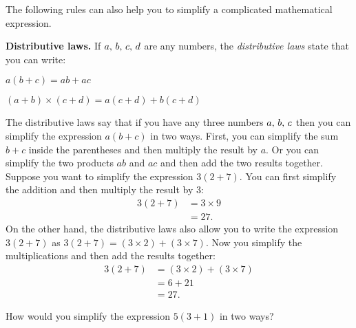\documentclass[a4paper,oneside,12pt]{article}
\begin{document}
The following rules can also help you to simplify a complicated
mathematical expression.

\begin{definition}
\textbf{Distributive laws.}
If ${a},\, {b},\, {c},\, {d}$ are any numbers, the
\emph{distributive laws} state that you can write:
\begin{packedenumeral}
\item $a (b + c) = ab + ac$

\item $(a + b) \times (c + d) = a(c + d) + b(c + d)$
\end{packedenumeral}
\end{definition}

The distributive laws say that if you have any three numbers
${a},\, {b},\, {c}$ then you can simplify the expression
$a(b + c)$ in two ways.  First, you can simplify the sum $b + c$
inside the parentheses and then multiply the result by $a$.  Or you
can simplify the two products $ab$ and $ac$ and then add the two
results together.  Suppose you want to simplify the expression
$3 (2 + 7)$.  You can first simplify the addition and then multiply
the result by $3$:
\begin{align*}
3 (2 + 7)
&=
3 \times 9 \\[4pt]
&=
27.
\end{align*}
On the other hand, the distributive laws also allow you to write the
expression $3 (2 + 7)$ as $3 (2 + 7) = (3 \times 2) + (3 \times 7)$.
Now you simplify the multiplications and then add the results
together:
\begin{align*}
3 (2 + 7)
&=
(3 \times 2) + (3 \times 7) \\[4pt]
&=
6 + 21 \\[4pt]
&=
27.
\end{align*}

\begin{exercise}
How would you simplify the expression $5 (3 + 1)$ in two ways?
\end{exercise}

\end{document}
